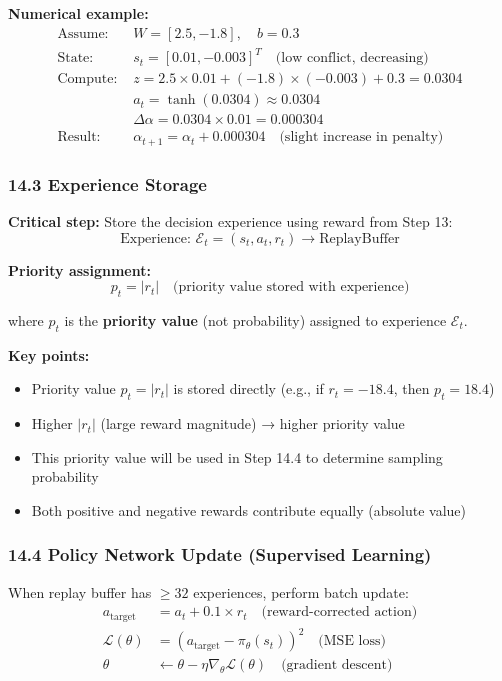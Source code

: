 \documentclass[11pt,a4paper]{article}
\begin{document}
\begin{itemize}
\textbf{Numerical example:}
\begin{align*}
\text{Assume: } & W = [2.5, -1.8], \quad b = 0.3 \\
\text{State: } & s_t = [0.01, -0.003]^T \quad \text{(low conflict, decreasing)} \\
\text{Compute: } & z = 2.5 \times 0.01 + (-1.8) \times (-0.003) + 0.3 = 0.0304 \\
& a_t = \tanh(0.0304) \approx 0.0304 \\
& \Delta\alpha = 0.0304 \times 0.01 = 0.000304 \\
\text{Result: } & \alpha_{t+1} = \alpha_t + 0.000304 \quad \text{(slight increase in penalty)}
\end{align*}

\subsubsection*{14.3 Experience Storage}
\textbf{Critical step:} Store the decision experience using reward from Step 13:
\begin{equation}
\text{Experience: } \mathcal{E}_t = (s_t, a_t, r_t) \rightarrow \text{ReplayBuffer}
\end{equation}

\textbf{Priority assignment:}
\begin{equation}
p_t = |r_t| \quad \text{(priority value stored with experience)}
\end{equation}

where $p_t$ is the \textbf{priority value} (not probability) assigned to experience $\mathcal{E}_t$.

\textbf{Key points:}
\begin{itemize}
    \item Priority value $p_t = |r_t|$ is stored directly (e.g., if $r_t = -18.4$, then $p_t = 18.4$)
    \item Higher $|r_t|$ (large reward magnitude) → higher priority value
    \item This priority value will be used in Step 14.4 to determine sampling probability
    \item Both positive and negative rewards contribute equally (absolute value)
\end{itemize}

\subsubsection*{14.4 Policy Network Update (Supervised Learning)}
When replay buffer has $\geq 32$ experiences, perform batch update:
\begin{align}
a_{\text{target}} &= a_t + 0.1 \times r_t \quad \text{(reward-corrected action)} \\
\mathcal{L}(\theta) &= (a_{\text{target}} - \pi_\theta(s_t))^2 \quad \text{(MSE loss)} \\
\theta &\leftarrow \theta - \eta \nabla_\theta \mathcal{L}(\theta) \quad \text{(gradient descent)}
\end{align}


\end{itemize}
\end{document}
